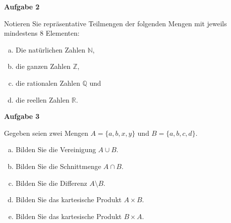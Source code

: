 \documentclass[a4paper,12pt]{article}
\newcommand{\Abschnitt}[1]{
	{
		\vspace*{0.5cm}
		\textsf{\textbf{#1}}
		\vspace*{0.2cm}
		
	}
}
\begin{document}
	\Abschnitt{Aufgabe 2}
	
	Notieren Sie repräsentative Teilmengen der folgenden Mengen mit jeweils mindestens 8 Elementen:
	
	\begin{enumerate}[a)]
		\item Die natürlichen Zahlen $\mathbb{N}$,
		\item die ganzen Zahlen $\mathbb{Z}$,
		\item die rationalen Zahlen $\mathbb{Q}$ und
		\item die reellen Zahlen $\mathbb{R}$.
	\end{enumerate}
	
	\Abschnitt{Aufgabe 3}
	
	Gegeben seien zwei Mengen $A=\{a, b, x, y\}$ und $B=\{a, b, c, d\}$.
	
	\begin{enumerate}[a)]
		\item Bilden Sie die Vereinigung $A \cup B$.
		\item Bilden Sie die Schnittmenge $A \cap B$.
		\item Bilden Sie die Differenz $A \setminus B$.
		\item Bilden Sie das kartesische Produkt $A \times B$.
		\item Bilden Sie das kartesische Produkt $B \times A$.
	\end{enumerate}
	
\end{document}
